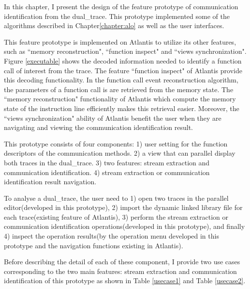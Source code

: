 

\label{chapter:newsol}
In this chapter, I present the design of the feature prototype of communication identification from the dual\_trace. This prototype implemented some of the algorithms described in Chapter\ref{chapter:alo} as well as the user interfaces.

This feature prototype is implemented on Atlantis to utilize its other features, such as ``memory reconstruction", ``function inspect" and ``views synchronization". Figure \ref{executable} shows the decoded information needed to identify a function call of interest from the trace. The feature ``function inspect" of Atlantis provide this decoding functionality. In the function call event reconstruction algorithm, the parameters of a function call is are retrieved from the memory state. The ``memory reconstruction" functionality of Atlantis which compute the memory state of the instruction line efficiently makes this retrieval easier. Moreover, the ``views synchronization" ability of Atlantis benefit the user when they are navigating and viewing the communication identification result.

This prototype consists of four components: 1) user setting for the function descriptors of the communication methods. 2) a view that can parallel display both traces in the dual\_trace. 3) two features: stream extraction and communication identification. 4) stream extraction or communication identification result navigation.

To analyse a dual\_trace, the user need to 1) open two traces in the parallel editor(developed in this prototype), 2) import the dynamic linked library file for each trace(existing feature of Atlantis), 3) perform the stream extraction or communication identification operations(developed in this prototype), and finally 4) inspect the operation results(by the operation menu developed in this prototype and the navigation functions existing in Atlantis).

Before describing the detail of each of these component, I provide two use cases corresponding to the two main features: stream extraction and communication identification of this prototype as shown in Table \ref{usecase1} and Table \ref{usecase2}.

